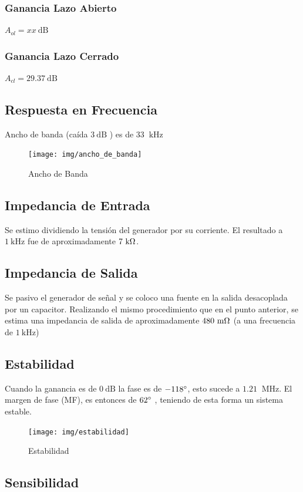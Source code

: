 \documentclass[a4paper,12pt,twoside]{article}
\newcommand{\khz}{\ensuremath{~\mathrm{kHz}}}
\newcommand{\kHz}{\ensuremath{~\mathrm{kHz}}}
\newcommand{\MHz}{\ensuremath{~\mathrm{MHz}}}
\newcommand{\mohm}{\ensuremath{~\mathrm{m}\ohm}}
\newcommand{\kohm}{\ensuremath{~\mathrm{k}\ohm}}
\newcommand{\dB}{\ensuremath{~\mathrm{dB}}}
\begin{document}
\subsubsection{Ganancia Lazo Abierto}
$A_{ol}=xx\dB$ 

\subsubsection{Ganancia Lazo Cerrado}
$A_{cl}=29.37\dB$ 

\subsection{Respuesta en Frecuencia}
Ancho de banda (caída $3 \dB$ ) es de 33 $\kHz$

\begin{figure}[H]
\centering
\texttt{[image: img/ancho\_de\_banda]}
\caption{Ancho de Banda}
\label{ancho_banda} 
\end{figure}

\subsection{Impedancia de Entrada}
Se estimo dividiendo la tensión del generador por su corriente. El resultado a $1 \kHz$ fue de aproximadamente $7 \kohm$.
\subsection{Impedancia de Salida}
Se pasivo el generador de señal y se coloco una fuente en la salida desacoplada por un capacitor. Realizando el mismo procedimiento que en el punto anterior, se estima una impedancia de salida de aproximadamente  $480 \mohm$ (a una frecuencia de $1 \khz$)

\subsection{Estabilidad}
Cuando la ganancia es de  $0\dB$ la fase es de $-118\degree$, esto sucede a $1.21$ $\MHz$.
El margen de fase (MF), es entonces de $62\degree$ , teniendo de esta forma un sistema estable.

\begin{figure}[H]
\centering
\texttt{[image: img/estabilidad]}
\caption{Estabilidad}
\label{estabilidad} 
\end{figure}


\subsection{Sensibilidad}
\end{document}
